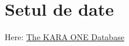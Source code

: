 \section{Setul de date}


Here: \href{http://www.cs.toronto.edu/~complingweb/data/karaOne/karaOne.html}
{The KARA ONE Database}
